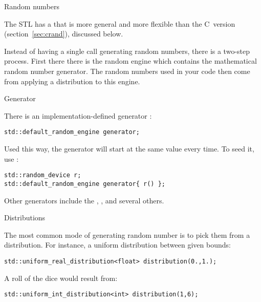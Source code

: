 
 {Random numbers}
\label{sec:stl:random}

The \ac{STL} has a
that is more general and more flexible than the C~version (section~\ref{sec:crand}),
discussed below.

Instead of having a single call generating random numbers,
there is a two-step process.
First there there is the random engine which contains the
mathematical random number generator.
The random numbers used in your code then come from
applying a distribution to this engine.

 {Generator}

There is an implementation-defined generator :
\begin{lstlisting}
std::default_random_engine generator;
\end{lstlisting}
Used this way, the generator will start at the same value every time.
To seed it,  use : 
\begin{lstlisting}
std::random_device r;
std::default_random_engine generator{ r() };
\end{lstlisting}

Other generators include the  ,
, and several others.

 {Distributions}

The most common mode of generating random number
is to pick them from a distribution.
For instance, a uniform distribution between given bounds:
\begin{lstlisting}
std::uniform_real_distribution<float> distribution(0.,1.);
\end{lstlisting}
A roll of the dice would result from:
\begin{lstlisting}
std::uniform_int_distribution<int> distribution(1,6);
\end{lstlisting}

